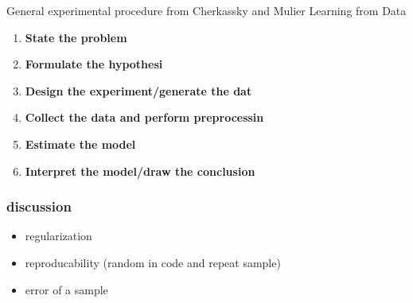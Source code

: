 General experimental procedure from Cherkassky and Mulier Learning from Data\cite{cherkassky1998learning}
\begin{enumerate}
    \item \textbf{State the problem}
    \item \textbf{Formulate the hypothesi}
    \item \textbf{Design the experiment/generate the dat}
    \item \textbf{Collect the data and perform preprocessin}
    \item \textbf{Estimate the model}
    \item \textbf{Interpret the model/draw the conclusion}
\end{enumerate}
\iffalse
\textbf{1. Statement of the Problem} There was no clear statement of the problem. Now I would formulate it: "How to produce most insulating layer with least energy? How do we define most insulating?" That's why there are two output variables rather than one.
\textbf{2. Hypothesis Formulation} formulate an unknown dependency and define input and output variables.
\textbf{3. Data Generation and Experiment Design} can be either in control of the modeler (designed experiment) or in an observational setting. The data collection can affect the sampling distribution and influence the next steps. 
\textbf{4. Collect the Data and Perform Preprocessing} here outliers are detected and data preprocessing/encoding/feature selection. Scaling by standard deviation might be a good idea, but independent scaling of variables can lead to suboptimal representation for the learning task. Feature selection: A small number of informative features make the task of estimating dependencies easier. 
\textbf{5. Model Estimation} The main goal is to construct a model for accurate prediction of future outputs
\textbf{6. Interpret the Model and Drawing Conclusions} The interpretability and accuracy of the model are compete. In classical statistics such as linearly parametrized function will suit both requirements. More complex and flexible models might lead to better estimates with less interpretability. Identifying the most important input variables. \cite{cherkassky1998learning}
\fi


\subsubsection{discussion}
\begin{itemize}
    \item regularization
    \item reproducability (random in code and repeat sample)
    \item error of a sample 
\end{itemize}


